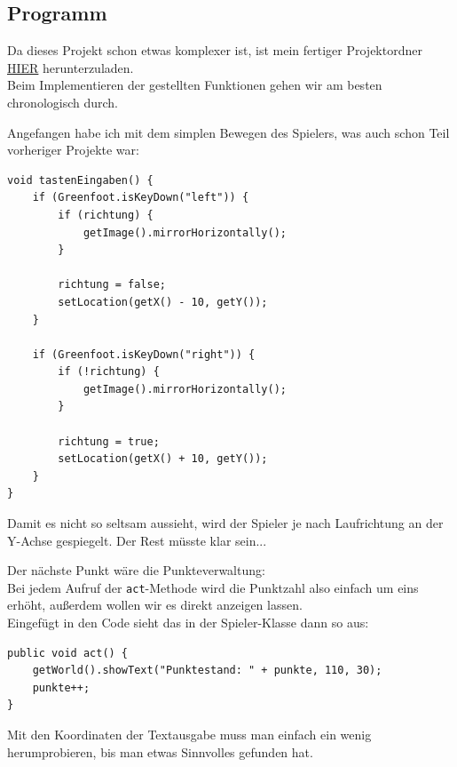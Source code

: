\documentclass{scrartcl}   %
\begin{document}
\subsection{Programm}

Da dieses Projekt schon etwas komplexer ist, ist mein fertiger Projektordner \href{https://github.com/cyb3rko/inf-schule-loesungen/raw/master/2/2.3/2.3.2/7.1.2.4\%20Space\%20Invaders/2.Entwicklung_des_Spiels/Space\%20Invaders.zip}{HIER} herunterzuladen.\\
Beim Implementieren der gestellten Funktionen gehen wir am besten chronologisch durch.

Angefangen habe ich mit dem simplen Bewegen des Spielers, was auch schon Teil vorheriger Projekte war:\\
\begin{lstlisting}
void tastenEingaben() {
    if (Greenfoot.isKeyDown("left")) {
        if (richtung) {
            getImage().mirrorHorizontally();
        }

        richtung = false;
        setLocation(getX() - 10, getY());
    }

    if (Greenfoot.isKeyDown("right")) {
        if (!richtung) {
            getImage().mirrorHorizontally();
        }

        richtung = true;
        setLocation(getX() + 10, getY());
    }
}
\end{lstlisting}

Damit es nicht so seltsam aussieht, wird der Spieler je nach Laufrichtung an der Y-Achse gespiegelt. Der Rest müsste klar sein...

Der nächste Punkt wäre die Punkteverwaltung:\\
Bei jedem Aufruf der \texttt{act}-Methode wird die Punktzahl also einfach um eins erhöht, außerdem wollen wir es direkt anzeigen lassen.\\
Eingefügt in den Code sieht das in der Spieler-Klasse dann so aus:

\newpage

\begin{lstlisting}
public void act() {
    getWorld().showText("Punktestand: " + punkte, 110, 30);
    punkte++;
}
\end{lstlisting}

Mit den Koordinaten der Textausgabe muss man einfach ein wenig herumprobieren, bis man etwas Sinnvolles gefunden hat.
\end{document}
